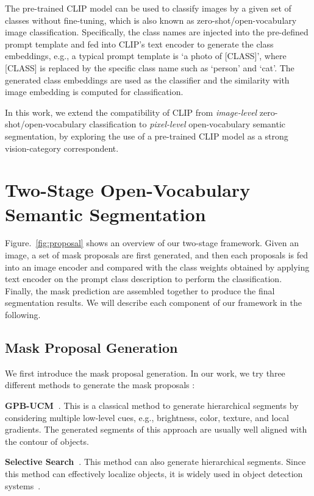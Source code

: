 \documentclass[runningheads]{llncs}
\begin{document}
The pre-trained CLIP model can be used to classify images by a given set of classes without fine-tuning, which is also known as zero-shot/open-vocabulary image classification. Specifically, the class names are injected into the pre-defined prompt template and fed into CLIP's text encoder to generate the class embeddings, e.g., a typical prompt template is `a photo of [CLASS]', where [CLASS] is replaced by the specific class name such as `person' and `cat'. The generated class embeddings are used as the classifier and the similarity with image embedding is computed for classification. 

In this work, we extend the compatibility of CLIP from \textit{image-level} zero-shot/open-vocabulary classification to \textit{pixel-level} open-vocabulary semantic segmentation, by exploring the use of a pre-trained CLIP model as a strong vision-category correspondent.


\section{Two-Stage Open-Vocabulary Semantic Segmentation}
Figure.~\ref{fig:proposal} shows an overview of our two-stage framework. Given an image, a set of mask proposals are first generated, and then each proposals is fed into an image encoder and compared with the class weights obtained by applying text encoder on the prompt class description to perform the classification. Finally, the mask prediction are assembled together to produce the final segmentation results. We will describe each component of our framework in the following.


\subsection{Mask Proposal Generation}
\label{sec:mask_proposal_generation}
We first introduce the mask proposal generation. In our work, we try three different methods to generate the mask proposals :


\noindent\textbf{GPB-UCM~\cite{arbelaez2010contour}}. 
This is a classical method to generate hierarchical segments by considering multiple low-level cues, e.g., brightness, color, texture, and local gradients. The generated segments of this approach are usually well aligned with the contour of objects. 


\noindent\textbf{Selective Search~\cite{uijlings2013selective}}. 
This method can also generate hierarchical segments. Since this method can effectively localize objects, it is widely used in object detection systems~\cite{girshick2015fast,girshick2014rich}.
\end{document}
